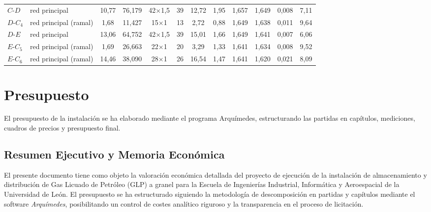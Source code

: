 \documentclass[12pt]{article}
\begin{document}
\begin{landscape}
\begin{table}[p]
{\begin{tabular}{llcccccccccc}
                $C$-$D$ & red principal & 10,77 & 76,179 & 42$\times$1,5 & 39 & 12,72 & 1,95 & 1,657 & 1,649 & 0,008 & 7,11 \\
                $D$-$C_4$ & red principal (ramal) & 1,68 & 11,427 & 15$\times$1 & 13 & 2,72 & 0,88 & 1,649 & 1,638 & 0,011 & 9,64 \\
                $D$-$E$ & red principal & 13,06 & 64,752 & 42$\times$1,5 & 39 & 15,01 & 1,66 & 1,649 & 1,641 & 0,007 & 6,06 \\
                $E$-$C_5$ & red principal (ramal) & 1,69 & 26,663 & 22$\times$1 & 20 & 3,29 & 1,33 & 1,641 & 1,634 & 0,008 & 9,52 \\
                $E$-$C_6$ & red principal (ramal) & 14,46 & 38,090 & 28$\times$1 & 26 & 16,54 & 1,47 & 1,641 & 1,620 & 0,021 & 8,09 \\
                \bottomrule
            \end{tabular}%
            }
        \end{table}
        \end{landscape}


        



    \section{Presupuesto}
    \label{Presupuesto}

        El presupuesto de la instalación se ha elaborado mediante el programa Arquímedes, estructurando las partidas en capítulos, mediciones, cuadros de precios y presupuesto final.

        \subsection*{Resumen Ejecutivo y Memoria Económica}

        El presente documento tiene como objeto la valoración económica detallada del proyecto de ejecución de la instalación de almacenamiento y distribución de Gas Licuado de Petróleo (GLP) a granel para la Escuela de Ingenierías Industrial, Informática y Aeroespacial de la Universidad de León. El presupuesto se ha estructurado siguiendo la metodología de descomposición en partidas y capítulos mediante el software \textit{Arquímedes}, posibilitando un control de costes analítico riguroso y la transparencia en el proceso de licitación.
\end{document}
